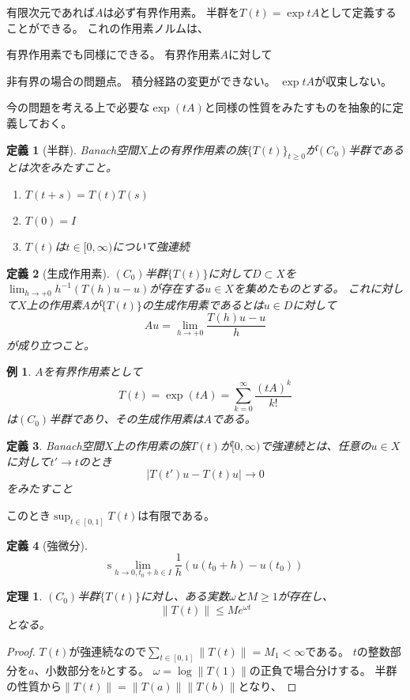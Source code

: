 \documentclass{jsarticle}
\newtheorem{dfn}{定義}
\newtheorem{eg}{例}
\newtheorem{thm}{定理}
\newcommand{\abs}[1]{|#1|}
\newcommand{\norm}[1]{\|#1\|}
\newcommand{\slim}{\mathrm{s}\lim}
\begin{document}
有限次元であれば$A$は必ず有界作用素。
半群を$T(t)=\exp tA$として定義することができる。
これの作用素ノルムは、

有界作用素でも同様にできる。
有界作用素$A$に対して

非有界の場合の問題点。
積分経路の変更ができない。
$\exp tA$が収束しない。

今の問題を考える上で必要な$\exp(tA)$と同様の性質をみたすものを抽象的に定義しておく。
\begin{dfn}[半群]
Banach空間$X$上の有界作用素の族$\{T(t)\}_{t\geq0}$が$(C_0)$半群であるとは次をみたすこと。
\begin{enumerate}
\item $T(t+s)=T(t)T(s)$
\item $T(0)=I$
\item $T(t)$は$t\in[0,\infty)$について強連続
\end{enumerate}
\end{dfn}

\begin{dfn}[生成作用素]
$(C_0)$半群$\{T(t)\}$に対して$D\subset X$を$\lim_{h\to+0}h^{-1}(T(h)u-u)$が存在する$u\in X$を集めたものとする。
これに対して$X$上の作用素$A$が$\{T(t)\}$の生成作用素であるとは$u\in D$に対して
\[
Au=\lim_{h\to+0}\frac{T(h)u-u}{h}
\]
が成り立つこと。
\end{dfn}
\begin{eg}
$A$を有界作用素として
\[
T(t)=\exp(tA)=\sum^\infty_{k=0}\frac{(tA)^k}{k!}
\]
は$(C_0)$半群であり、その生成作用素は$A$である。
\end{eg}

\begin{dfn}
Banach空間$X$上の作用素の族$T(t)$が$[0,\infty)$で強連続とは、任意の$u\in X$に対して$t'\to t$のとき
\[
\abs{T(t')u-T(t)u}\to 0
\]
をみたすこと
\end{dfn}
このとき$\sup_{t\in[0,1]}T(t)$は有限である。

\begin{dfn}[強微分]
\[
\slim_{h\to0,t_0+h\in I}\frac{1}{h}(u(t_0+h)-u(t_0))
\]
\end{dfn}

\begin{thm}
$(C_0)$半群$\{T(t)\}$に対し、ある実数$\omega$と$M\geq1$が存在し、
\[
\norm{T(t)}\leq Me^{\omega t}
\]
となる。
\end{thm}
\begin{proof}
$T(t)$が強連続なので$\sum_{t\in[0,1]}\norm{T(t)}=M_1<\infty$である。
$t$の整数部分を$a$、小数部分を$b$とする。
$\omega=\log\norm{T(1)}$の正負で場合分けする。
半群の性質から$\norm{T(t)}=\norm{T(a)}\norm{T(b)}$となり、
\end{proof}
\end{document}
